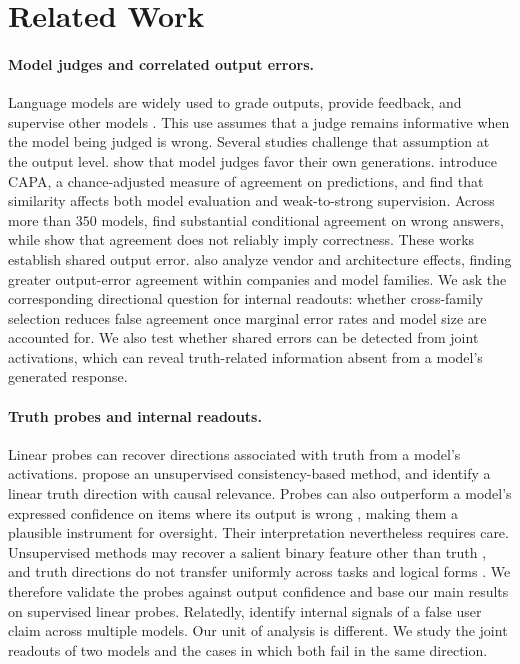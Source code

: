 \section{Related Work}
\label{sec:related}

\paragraph{Model judges and correlated output errors.}
Language models are widely used to grade outputs, provide feedback, and
supervise other models \citep{zheng2023judge,irving2018debate,bowman2022measuring,
burns2023weak}. This use assumes that a judge remains informative when the model
being judged is wrong. Several studies challenge that assumption at the output
level. \citet{panickssery2024selfpreference} show that model judges favor their
own generations. \citet{goel2025alike} introduce CAPA, a chance-adjusted measure
of agreement on predictions, and find that similarity affects both model
evaluation and weak-to-strong supervision. Across more than $350$ models,
\citet{kim2025correlated} find substantial conditional agreement on wrong
answers, while \citet{ding2026agree} show that agreement does not reliably imply
correctness. These works establish shared output error. \citet{kim2025correlated}
also analyze vendor and architecture effects, finding greater output-error
agreement within companies and model families. We ask the corresponding
directional question for internal readouts: whether cross-family selection
reduces false agreement once marginal error rates and model size are accounted
for. We also test whether shared errors can be detected from joint activations,
which can reveal truth-related information absent from a model's generated
response.

\paragraph{Truth probes and internal readouts.}
Linear probes can recover directions associated with truth from a model's
activations. \citet{burns2023ccs} propose an unsupervised consistency-based
method, and \citet{marks2024geometry} identify a linear truth direction with
causal relevance. Probes can also outperform a model's expressed confidence on
items where its output is wrong \citep{liu2023dissonance}, making them a
plausible instrument for oversight. Their interpretation nevertheless requires
care. Unsupervised methods may recover a salient binary feature other than truth
\citep{farquhar2024challenges}, and truth directions do not transfer uniformly
across tasks and logical forms \citep{bao2025probing}. We therefore validate the
probes against output confidence and base our main results on supervised linear
probes. Relatedly, \citet{pandey2026sycophancy} identify internal signals of a
false user claim across multiple models. Our unit of analysis is different. We
study the joint readouts of two models and the cases in which both fail in the same
direction.

